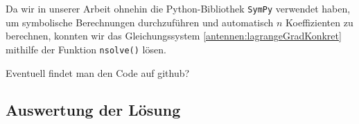 Da wir in unserer Arbeit ohnehin die Python-Bibliothek \texttt{SymPy} verwendet haben, 
um symbolische Berechnungen durchzuführen und automatisch $n$ Koeffizienten zu berechnen, 
konnten wir das Gleichungssystem \eqref{antennen:lagrangeGradKonkret} mithilfe der Funktion 
\texttt{nsolve()} lösen.


Eventuell findet man den Code auf github?

\subsection{Auswertung der Lösung\label{antennen:auswertung}}

\begin{figure}[htbp]
	\centering
	
	

\end{figure}
